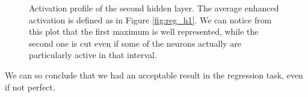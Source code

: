 \begin{figure}[h]
\begin{minipage}[t]{0.48\textwidth}
        \caption{Activation profile of the second hidden layer. The average enhanced activation is defined as in Figure \ref{fig:reg_h1}.
            We can notice from this plot that the first maximum is well represented, while the second one is cut even if some of the
            neurons actually are particularly active in that interval.}
        \label{fig:reg_h2}
    \end{minipage}
\end{figure}

We can so conclude that we had an acceptable result in the regression task, even if not perfect.